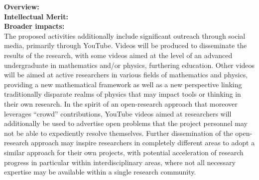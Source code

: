 \thispagestyle{empty}
\noindent
\textbf{Overview:}\\

\noindent
\textbf{Intellectual Merit:}  \\

\noindent
\textbf{Broader impacts:}  \\

The proposed activities additionally include significant outreach through social media, primarily through YouTube.  Videos will be produced to disseminate the results of the research, with some videos aimed at the level of an advanced undergraduate in mathematics and/or physics, furthering education.  Other videos will be aimed at active researchers in various fields of mathematics and physics, providing a new mathematical framework as well as a new perspective linking traditionally disparate realms of physics that may impact tools or thinking in their own research.  In the spirit of an open-research approach that moreover leverages ``crowd'' contributions, YouTube videos aimed at researchers will additionally be used to advertise open problems that the project personnel may not be able to expediently resolve themselves. Further dissemination of the open-research approach may inspire researchers in completely different areas to adopt a similar approach for their own projects, with potential acceleration of research progress in particular within interdisciplinary areas, where not all necessary expertise may be available within a single research community. 

